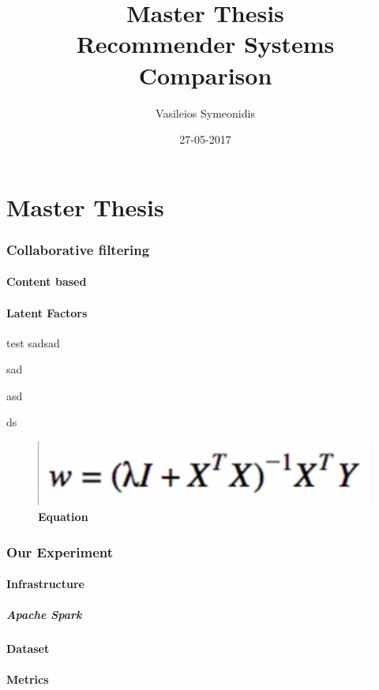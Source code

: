 \documentclass{article}
\title{Master Thesis \\ Recommender Systems Comparison}
\date{27-05-2017}
\author{Vasileios Symeonidis}
\begin{document}
\maketitle
\newpage
\tableofcontents
{}
\newpage
{}

\part{Master Thesis}

\section{Collaborative filtering}
\subsection{Content based}
\subsection{Latent Factors}
test
sadsad

sad

asd

ds
\begin{figure}[ht]
\centering
\includegraphics[width=0.7\linewidth]{images/equation01}
\caption{\bfseries Equation}
\label{fig:equation01}
\end{figure}

\section{Our Experiment}
\subsection{Infrastructure}
\subsubsection{Apache Spark}
\subsection{Dataset}
\subsection{Metrics}
\end{document}
